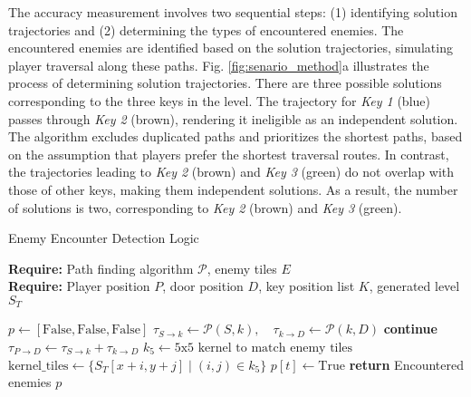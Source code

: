 


The accuracy measurement involves two sequential steps: (1) identifying solution trajectories and (2) determining the types of encountered enemies. The encountered enemies are identified based on the solution trajectories, simulating player traversal along these paths. Fig. \ref{fig:senario_method}a illustrates the process of determining solution trajectories. There are three possible solutions corresponding to the three keys in the level. The trajectory for \textcolor{key_1}{\textit{Key 1} (blue)} passes through \textcolor{key_2}{\textit{Key 2} (brown)}, rendering it ineligible as an independent solution. The algorithm excludes duplicated paths and prioritizes the shortest paths, based on the assumption that players prefer the shortest traversal routes. In contrast, the trajectories leading to \textcolor{key_2}{\textit{Key 2} (brown)} and \textcolor{key_3}{\textit{Key 3} (green)} do not overlap with those of other keys, making them independent solutions.
As a result, the number of solutions is two, corresponding to \textcolor{key_2}{\textit{Key 2} (brown)} and \textcolor{key_3}{\textit{Key 3} (green)}.



\begin{algorithm}[!h]
\caption{Enemy Encounter Detection Logic}
\label{alg:distinct_path}
\textbf{Require:} Path finding algorithm $\mathcal{P}$, enemy tiles $E$ \\
\textbf{Require:} Player position $P$, door position $D$, key position list $K$, generated level $S_{T}$

\begin{algorithmic}[1]
\State $p \gets [\text{False}, \text{False}, \text{False}]$ 
    \State $\tau_{S\to k} \gets \mathcal{P}(S, k), \quad \tau_{k\to D} \gets \mathcal{P}(k, D)$
        \State \textbf{continue} 
    \EndIf
    \State $\tau_{P\to D} \gets \tau_{S\to k} + \tau_{k\to D}$ 
    \State $k_5 \gets \text{5x5 kernel to match enemy tiles}$
        \State $\text{kernel\_tiles} \gets \{S_{T}[x+i, y+j] \mid (i, j) \in k_5\}$
                \State $p[t] \gets \text{True}$ 
            \EndIf
        \EndFor
    \EndFor
\EndFor
\State \textbf{return} Encountered enemies $p$
\end{algorithmic}
\end{algorithm}





